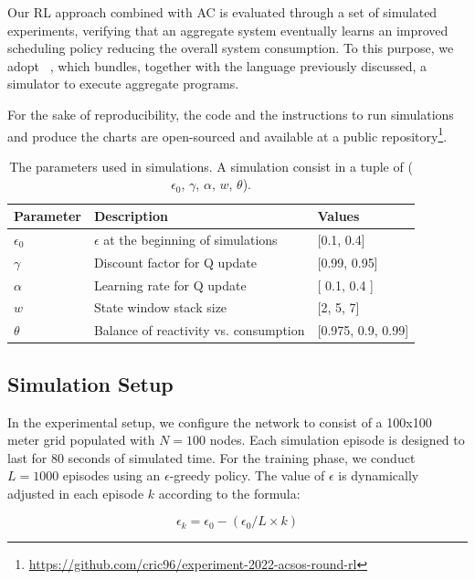 Our \ac{RL} approach combined with \ac{AC} is evaluated through a set of simulated experiments, 
 verifying that an aggregate system eventually learns an improved scheduling policy reducing the overall system consumption.
%
To this purpose, we adopt \scafi{}~\cite{DBLP:conf/isola/CasadeiVAD20}, 
 which bundles, together with the language previously discussed, a simulator to execute aggregate programs.

%
For the sake of reproducibility, the code and the instructions to run simulations and produce the charts are open-sourced and available at a public repository\footnote{\url{https://github.com/cric96/experiment-2022-acsos-round-rl}}.
\begin{table}[t]
    \centering
    \begin{tabular}{|l|l|l|}
    \hline
    Parameter & Description & Values                 \\ \hline
    $\epsilon_0$ & $\epsilon$ at the beginning of simulations & {[}0.1, 0.4{]}        \\ \hline
    $\gamma$  & Discount factor for Q update & {[}0.99, 0.95{]}   \\ \hline
    $\alpha$ & Learning rate for Q update & {[} 0.1, 0.4 {]}                    \\ \hline
    $w$     & State window stack size  & {[}2, 5, 7{]}          \\ \hline
    $\theta$ & Balance of reactivity vs. consumption & {[}0.975, 0.9, 0.99{]} \\ \hline
    \end{tabular}
    \caption{The parameters used in simulations. A simulation consist in a tuple of ($\epsilon_0$, $\gamma$, $\alpha$, $w$, $\theta$).}
    \label{acsos2022:tab:parameters}
\end{table}
\subsection{Simulation Setup}\label{acsos2022:s:simulation-setup}
In the experimental setup, we configure the network to consist of a 100x100 meter grid populated with $N=100$ nodes. 
 Each simulation episode is designed to last for 80 seconds of simulated time. 
 For the training phase, we conduct $L=1000$ episodes using an $\epsilon$-greedy policy. 
 The value of $\epsilon$ is dynamically adjusted in each episode $k$ according to the formula:

\begin{equation}
\epsilon_k = \epsilon_0 - (\epsilon_0 / L \times k)
\end{equation}

